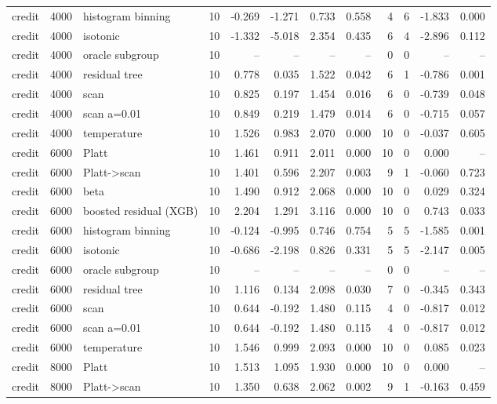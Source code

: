 \begin{tabular}{lllrrrrrrrrr}
credit & 4000 & histogram binning & 10 & -0.269 & -1.271 & 0.733 & 0.558 & 4 & 6 & -1.833 & 0.000 \\
credit & 4000 & isotonic & 10 & -1.332 & -5.018 & 2.354 & 0.435 & 6 & 4 & -2.896 & 0.112 \\
credit & 4000 & oracle subgroup & 10 & -- & -- & -- & -- & 0 & 0 & -- & -- \\
credit & 4000 & residual tree & 10 & 0.778 & 0.035 & 1.522 & 0.042 & 6 & 1 & -0.786 & 0.001 \\
credit & 4000 & scan & 10 & 0.825 & 0.197 & 1.454 & 0.016 & 6 & 0 & -0.739 & 0.048 \\
credit & 4000 & scan a=0.01 & 10 & 0.849 & 0.219 & 1.479 & 0.014 & 6 & 0 & -0.715 & 0.057 \\
credit & 4000 & temperature & 10 & 1.526 & 0.983 & 2.070 & 0.000 & 10 & 0 & -0.037 & 0.605 \\
credit & 6000 & Platt & 10 & 1.461 & 0.911 & 2.011 & 0.000 & 10 & 0 & 0.000 & -- \\
credit & 6000 & Platt->scan & 10 & 1.401 & 0.596 & 2.207 & 0.003 & 9 & 1 & -0.060 & 0.723 \\
credit & 6000 & beta & 10 & 1.490 & 0.912 & 2.068 & 0.000 & 10 & 0 & 0.029 & 0.324 \\
credit & 6000 & boosted residual (XGB) & 10 & 2.204 & 1.291 & 3.116 & 0.000 & 10 & 0 & 0.743 & 0.033 \\
credit & 6000 & histogram binning & 10 & -0.124 & -0.995 & 0.746 & 0.754 & 5 & 5 & -1.585 & 0.001 \\
credit & 6000 & isotonic & 10 & -0.686 & -2.198 & 0.826 & 0.331 & 5 & 5 & -2.147 & 0.005 \\
credit & 6000 & oracle subgroup & 10 & -- & -- & -- & -- & 0 & 0 & -- & -- \\
credit & 6000 & residual tree & 10 & 1.116 & 0.134 & 2.098 & 0.030 & 7 & 0 & -0.345 & 0.343 \\
credit & 6000 & scan & 10 & 0.644 & -0.192 & 1.480 & 0.115 & 4 & 0 & -0.817 & 0.012 \\
credit & 6000 & scan a=0.01 & 10 & 0.644 & -0.192 & 1.480 & 0.115 & 4 & 0 & -0.817 & 0.012 \\
credit & 6000 & temperature & 10 & 1.546 & 0.999 & 2.093 & 0.000 & 10 & 0 & 0.085 & 0.023 \\
credit & 8000 & Platt & 10 & 1.513 & 1.095 & 1.930 & 0.000 & 10 & 0 & 0.000 & -- \\
credit & 8000 & Platt->scan & 10 & 1.350 & 0.638 & 2.062 & 0.002 & 9 & 1 & -0.163 & 0.459 \\

\end{tabular}
